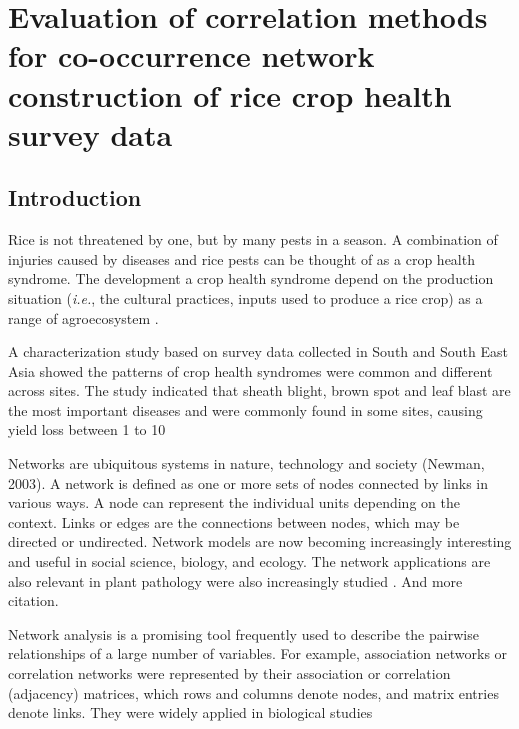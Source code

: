 \section{Evaluation of correlation methods for co-occurrence network construction of rice crop health survey data}

\subsection*{Introduction}

Rice is not threatened by one, but by many pests in a season. A combination of injuries caused by diseases and rice pests can be thought of as a crop health syndrome. The development a crop health syndrome depend on the production situation (\textit{i.e.}, the cultural practices, inputs used to produce a rice crop) as a range of agroecosystem \citep{Savary_2006_Quantification}.

A characterization study based on survey data collected in South and South East Asia \citep{Savary_2000_Characterization} showed the patterns of crop health syndromes were common and different across sites. The study indicated that sheath blight, brown spot and leaf blast are the most important diseases and were commonly found in some sites, causing yield loss between 1 to 10%

Networks are ubiquitous systems in nature, technology and society (Newman, 2003). A network is defined as one or more sets of nodes connected by links in various ways. A node can represent the individual units depending on the context. Links or edges are the connections between nodes, which may be directed or undirected. Network models are now becoming increasingly interesting and useful in social science, biology, and ecology. The network applications  are also relevant in plant pathology were also increasingly studied \citep{Moslonka_Lefebvre_2011}. And more citation.

Network analysis is a promising tool frequently used to describe the pairwise relationships of a large number of variables. For example, association networks or correlation networks were represented by their association or correlation (adjacency) matrices, which rows and columns denote nodes, and matrix entries denote links. They were widely applied in biological studies \citep{Toubiana_2013_Net, Barabasi_2004_Network}

